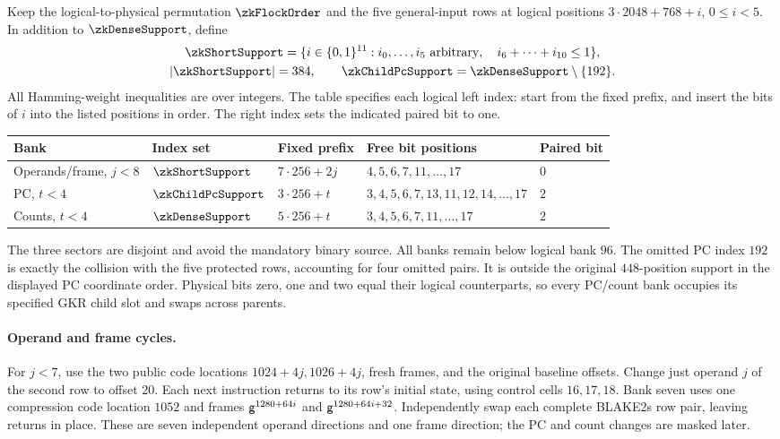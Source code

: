 Keep the logical-to-physical permutation $\zkFlockOrder$ and the five general-input rows at logical positions $3\cdot2048+768+i$, $0\le i<5$. In addition to $\zkDenseSupport$, define
\[
 \begin{gathered}
 \zkShortSupport=\{i\in\cube{11}:i_0,\ldots,i_5\text{ arbitrary},\quad i_6+\cdots+i_{10}\le1\},\\
 |\zkShortSupport|=384,
 \qquad \zkChildPcSupport=\zkDenseSupport\setminus\{192\}.
 \end{gathered}
\]
All Hamming-weight inequalities are over integers. The table specifies each logical left index: start from the fixed prefix, and insert the bits of $i$ into the listed positions in order. The right index sets the indicated paired bit to one.

\begin{center}
\small
\begin{tabular}{@{}lllll@{}}
\toprule
Bank & Index set & Fixed prefix & Free bit positions & Paired bit\\
\midrule
Operands/frame, $j<8$ & $\zkShortSupport$ & $7\cdot256+2j$ & $4,5,6,7,11,\ldots,17$ & $0$\\
PC, $t<4$ & $\zkChildPcSupport$ & $3\cdot256+t$ & $3,4,5,6,7,13,11,12,14,\ldots,17$ & $2$\\
Counts, $t<4$ & $\zkDenseSupport$ & $5\cdot256+t$ & $3,4,5,6,7,11,\ldots,17$ & $2$\\
\bottomrule
\end{tabular}
\end{center}

The three sectors are disjoint and avoid the mandatory binary source. All banks remain below logical bank $96$. The omitted PC index $192$ is exactly the collision with the five protected rows, accounting for four omitted pairs. It is outside the original $448$-position support in the displayed PC coordinate order. Physical bits zero, one and two equal their logical counterparts, so every PC/count bank occupies its specified GKR child slot and swaps across parents.

\paragraph{Operand and frame cycles.} For $j<7$, use the two public code locations $1024+4j,1026+4j$, fresh frames, and the original baseline offsets. Change just operand $j$ of the second row to offset $20$. Each next instruction returns to its row's initial state, using control cells $16,17,18$. Bank seven uses one compression code location $1052$ and frames $\mathsf{g}^{1280+64i}$ and $\mathsf{g}^{1280+64i+32}$. Independently swap each complete BLAKE2s row pair, leaving returns in place. These are seven independent operand directions and one frame direction; the PC and count changes are masked later.


